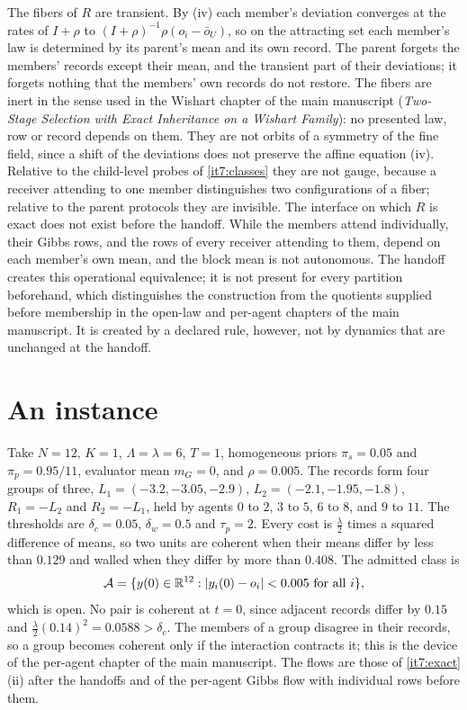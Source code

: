 \documentclass[11pt,letterpaper]{report}
\begin{document}
The fibers of $R$ are transient. By (iv) each member's deviation converges at the rates of $I+\rho$ to $(I+\rho)^{-1}\rho(o_i-\bar o_U)$, so on the attracting set each member's law is determined by its parent's mean and its own record. The parent forgets the members' records except their mean, and the transient part of their deviations; it forgets nothing that the members' own records do not restore. The fibers are inert in the sense used in the Wishart chapter of the main manuscript (\emph{Two-Stage Selection with Exact Inheritance on a Wishart Family}): no presented law, row or record depends on them. They are not orbits of a symmetry of the fine field, since a shift of the deviations does not preserve the affine equation (iv). Relative to the child-level probes of \cref{it7:classes} they are not gauge, because a receiver attending to one member distinguishes two configurations of a fiber; relative to the parent protocols they are invisible. The interface on which $R$ is exact does not exist before the handoff. While the members attend individually, their Gibbs rows, and the rows of every receiver attending to them, depend on each member's own mean, and the block mean is not autonomous. The handoff creates this operational equivalence; it is not present for every partition beforehand, which distinguishes the construction from the quotients supplied before membership in the open-law and per-agent chapters of the main manuscript. It is created by a declared rule, however, not by dynamics that are unchanged at the handoff.

\chapter{An instance}
\label{it7:ch-instance}

Take $N=12$, $K=1$, $\Lambda=\lambda=6$, $T=1$, homogeneous priors $\pi_s=0.05$ and $\pi_p=0.95/11$, evaluator mean $m_G=0$, and $\rho=0.005$. The records form four groups of three, $L_1=(-3.2,-3.05,-2.9)$, $L_2=(-2.1,-1.95,-1.8)$, $R_1=-L_2$ and $R_2=-L_1$, held by agents $0$ to $2$, $3$ to $5$, $6$ to $8$, and $9$ to $11$. The thresholds are $\delta_c=0.05$, $\delta_w=0.5$ and $\tau_p=2$. Every cost is $\frac\lambda2$ times a squared difference of means, so two units are coherent when their means differ by less than $0.129$ and walled when they differ by more than $0.408$. The admitted class is
\begin{equation}
\mathcal A=\{y(0)\in\mathbb R^{12}:|y_i(0)-o_i|<0.005\text{ for all }i\},
\label{it7:admitted}
\end{equation}
which is open. No pair is coherent at $t=0$, since adjacent records differ by $0.15$ and $\frac\lambda2(0.14)^2=0.0588>\delta_c$. The members of a group disagree in their records, so a group becomes coherent only if the interaction contracts it; this is the device of the per-agent chapter of the main manuscript. The flows are those of \cref{it7:exact}(ii) after the handoffs and of the per-agent Gibbs flow with individual rows before them.
\end{document}
